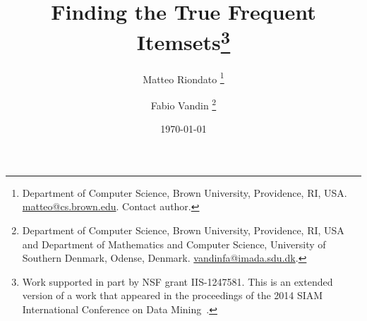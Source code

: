 \documentclass[twoside]{article}
\begin{document}
\title{Finding the True Frequent Itemsets\thanks{Work supported in part by NSF
grant IIS-1247581.
 This is an extended version of a work that appeared in the proceedings of the
 2014 SIAM International Conference on Data Mining~\citep{RiondatoV14}.
}
}
\author{Matteo Riondato
\thanks{Department of Computer Science, Brown University, Providence, RI, USA.
\url{matteo@cs.brown.edu}. Contact author.}
\and Fabio Vandin
\thanks{Department of Computer Science, Brown University, Providence, RI, USA
and Department of Mathematics and Computer Science, University of Southern
Denmark, Odense, Denmark. \url{vandinfa@imada.sdu.dk}.}
}

\date{\today}

\maketitle












%
%

%



\end{document}
